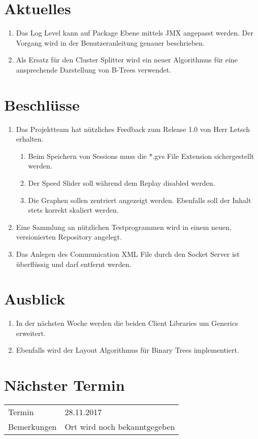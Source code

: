 \documentclass[11pt, a4paper,oneside]{scrartcl}
\begin{document}
	\section{Aktuelles}
	\begin{enumerate}
		\item Das Log Level kann auf Package Ebene mittels JMX angepasst werden. Der Vorgang wird in der Benutzeranleitung genauer beschrieben.
		\item Als Ersatz für den Cluster Splitter wird ein neuer Algorithmus für eine ansprechende Darstellung von B-Trees verwendet.
	\end{enumerate}
	
	\section{Beschlüsse}
	\begin{enumerate}
		\item Das Projektteam hat nützliches Feedback zum Release 1.0 von Herr Letsch erhalten.
		\begin{enumerate}
			\item Beim Speichern von Sessions muss die *.gvs File Extension sichergestellt werden.
			\item Der Speed Slider soll während dem Replay disabled werden. 
			\item Die Graphen sollen zentriert angezeigt werden. Ebenfalls soll der Inhalt stets korrekt skaliert werden.
		\end{enumerate}
		\item Eine Sammlung an nützlichen Testprogrammen wird in einem neuen, versionierten Repository angelegt.		
		\item Das Anlegen des Communication XML File durch den Socket Server ist überflüssig und darf entfernt werden.
	\end{enumerate} 
	
	\section{Ausblick}
	\begin{enumerate}
		\item In der nächsten Woche werden die beiden Client Libraries um Generics erweitert.
		\item Ebenfalls wird der Layout Algorithmus für Binary Trees implementiert.
	\end{enumerate}
	
	\section{Nächster Termin}
	\begin{tabu} to \linewidth {l X }
		\toprule
		Termin & 28.11.2017  \\
		Bemerkungen & Ort wird noch bekanntgegeben  \\
		\bottomrule
	\end{tabu}
	
\end{document}

